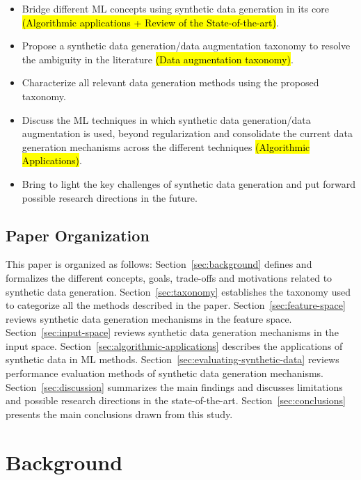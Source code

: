 \documentclass[parskip=full]{scrartcl}
\begin{document}
\begin{itemize}
    \item Bridge different ML concepts using synthetic data generation in its
        core \hl{(Algorithmic applications + Review of the State-of-the-art)}.
    \item Propose a synthetic data generation/data augmentation taxonomy to
        resolve the ambiguity in the literature \hl{(Data augmentation
        taxonomy)}.
    \item Characterize all relevant data generation methods using the proposed
        taxonomy. 
    \item Discuss the ML techniques in which synthetic data generation/data
        augmentation is used, beyond regularization and consolidate the
        current data generation mechanisms across the different techniques
        \hl{(Algorithmic Applications)}.
    \item Bring to light the key challenges of synthetic data generation and
        put forward possible research directions in the future.
\end{itemize}


\subsection{Paper Organization}

This paper is organized as follows: Section~\ref{sec:background} defines and
formalizes the different concepts, goals, trade-offs and motivations related
to synthetic data generation. Section~\ref{sec:taxonomy} establishes the
taxonomy used to categorize all the methods described in the paper.
Section~\ref{sec:feature-space} reviews synthetic data generation
mechanisms in the feature space. Section~\ref{sec:input-space}
reviews synthetic data generation mechanisms in the input space.
Section~\ref{sec:algorithmic-applications} describes the applications of
synthetic data in ML methods. Section~\ref{sec:evaluating-synthetic-data}
reviews performance evaluation methods of synthetic data generation
mechanisms. Section~\ref{sec:discussion} summarizes the main findings and
discusses limitations and possible research directions in the
state-of-the-art. Section~\ref{sec:conclusions} presents the main conclusions
drawn from this study.

\section{Background}~\label{sec:background}
\end{document}

